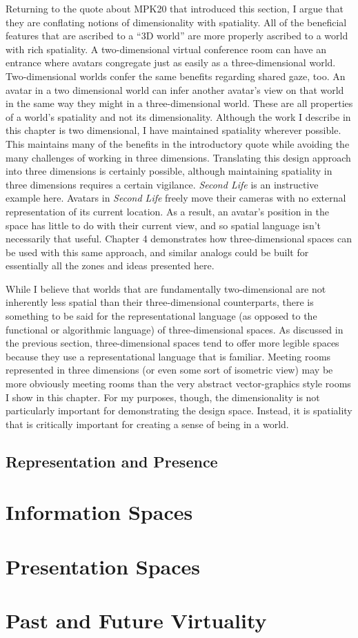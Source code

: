 Returning to the quote about MPK20 that introduced this section, I argue that they are conflating notions of dimensionality with spatiality. All of the beneficial features that are ascribed to a “3D world” are more properly ascribed to a world with rich spatiality. A two-dimensional virtual conference room can have an entrance where avatars congregate just as easily as a three-dimensional world. Two-dimensional worlds confer the same benefits regarding shared gaze, too. An avatar in a two dimensional world can infer another avatar’s view on that world in the same way they might in a three-dimensional world. These are all properties of a world’s spatiality and not its dimensionality. Although the work I describe in this chapter is two dimensional, I have maintained spatiality wherever possible. This maintains many of the benefits in the introductory quote while avoiding the many challenges of working in three dimensions. Translating this design approach into three dimensions is certainly possible, although maintaining spatiality in three dimensions requires a certain vigilance. \emph{Second Life} is an instructive example here. Avatars in \emph{Second Life} freely move their cameras with no external representation of its current location. As a result, an avatar’s position in the space has little to do with their current view, and so spatial language isn’t necessarily that useful.  Chapter 4 demonstrates how three-dimensional spaces can be used with this same approach, and similar analogs could be built for essentially all the zones and ideas presented here.

While I believe that worlds that are fundamentally two-dimensional are not inherently less spatial than their three-dimensional counterparts, there is something to be said for the representational language (as opposed to the functional or algorithmic language) of three-dimensional spaces. As discussed in the previous section, three-dimensional spaces tend to offer more legible spaces because they use a representational language that is familiar. Meeting rooms represented in three dimensions (or even some sort of isometric view) may be more obviously meeting rooms than the very abstract vector-graphics style rooms I show in this chapter. For my purposes, though, the dimensionality is not particularly important for demonstrating the design space. Instead, it is spatiality that is critically important for creating a sense of being in a world.

\subsection{Representation and Presence}



\section{Information Spaces}


\section{Presentation Spaces}


\section{Past and Future Virtuality}